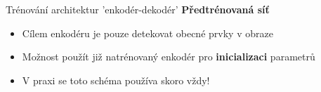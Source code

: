 \documentclass[aspectratio=1610]{beamer}
\begin{document}
\begin{frame}{Trénování architektur 'enkodér-dekodér'}
\textbf{Předtrénovaná síť}
\begin{itemize}
	\item Cílem enkodéru je pouze detekovat obecné prvky v obraze
	\item Možnost použít již natrénovaný enkodér pro \textbf{inicializaci} parametrů
	\item V praxi se toto schéma používa skoro vždy!
\end{itemize}
\end{frame}
\end{document}
